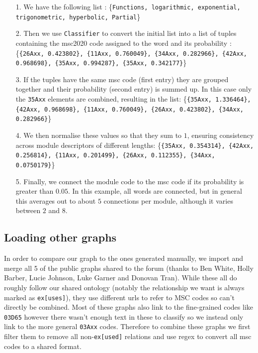 \documentclass[english, 12pt]{article}
\begin{document}
\begin{itemize}
\item[1.] We have the following list : 
\{\texttt{Functions, logarithmic, exponential, trigonometric, hyperbolic, Partial}\}
\item[2.] Then we use \texttt{Classifier} to convert the initial list into a list of tuples containing the msc2020 code assigned to the word and its probability : 
\{\texttt{\{26Axx, 0.423802\}, \{11Axx, 0.760049\}, \{34Axx, 0.282966\}, \{42Axx, 0.968698\}, \{35Axx, 0.994287\}, \{35Axx, 0.342177\}}\}
\item[3.] If the tuples have the same msc code (first entry) they are grouped together and their probability (second entry) is summed up. In this case only the \texttt{35Axx} elements are combined, resulting in the list: \{\texttt{\{35Axx, 1.336464\}, \{42Axx, 0.968698\}, \{11Axx, 0.760049\}, \{26Axx, 0.423802\}, \{34Axx, 0.282966\}}\}
	\item[4.] We then normalise these values so that they sum to $1$, ensuring consistency across module descriptors of different lengths: \{\texttt{\{35Axx, 0.354314\}, \{42Axx, 0.256814\}, \{11Axx, 0.201499\}, \{26Axx, 0.112355\}, \{34Axx, 0.0750179\}}\}
   	\item[5.] Finally, we connect the module code to the msc code if its probability is greater than $0.05$. In this example, all words are connected, but in general this averages out to about $5$ connections per module, although it varies between $2$ and $8$. 
\end{itemize}

\subsection{Loading other graphs}
In order to compare our graph to the ones generated manually, we import and merge all 5 of the public graphs shared to the forum (thanks to Ben White, Holly Barber, Lucie Johnson, Luke Garner and Donovan Tran). While these all do roughly follow our shared ontology (notably the relationship we want is always marked as \texttt{ex[uses]}), they use different urls to refer to MSC codes so can't directly be combined. Most of these graphs also link to the fine-grained codes like \texttt{03D65} however there wasn't enough text in these to classify so we instead only link to the more general \texttt{03Axx} codes. Therefore to combine these graphs we first filter them to remove all non-\texttt{ex[used]} relations and use regex to convert all msc codes to a shared format.
\end{document}

